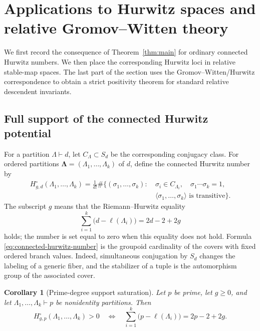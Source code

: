 \documentclass[11pt]{amsart}
\theoremstyle{plain}
\newtheorem{corollary}[theorem]{Corollary}
\theoremstyle{definition}
\numberwithin{equation}{section}
\begin{document}
\section{Applications to Hurwitz spaces and relative Gromov--Witten theory}
\label{sec:applications}

We first record the consequence of Theorem~\ref{thm:main} for ordinary
connected Hurwitz numbers.  We then place the corresponding Hurwitz loci in
relative stable-map spaces.  The last part of the section uses the
Gromov--Witten/Hurwitz correspondence to obtain a strict positivity theorem
for standard relative descendent invariants.

\subsection{Full support of the connected Hurwitz potential}

For a partition $\Lambda\vdash d$, let $C_\Lambda\subset S_d$ be the
corresponding conjugacy class.  For ordered partitions
$\boldsymbol\Lambda=(\Lambda_1,\ldots,\Lambda_k)$ of $d$, define the
connected Hurwitz number by
\begin{equation}\label{eq:connected-hurwitz-number}
 \begin{split}
 H^\circ_{g,d}(\Lambda_1,\ldots,\Lambda_k)
 =\frac{1}{d!}\#\biggl\{(\sigma_1,\ldots,\sigma_k):\ &
 \sigma_i\in C_{\Lambda_i},\quad \sigma_1\cdots\sigma_k=1,\\[-2pt]
 &\langle\sigma_1,\ldots,\sigma_k\rangle
 \text{ is transitive}\biggr\}.
 \end{split}
\end{equation}
The subscript $g$ means that the Riemann--Hurwitz equality
\begin{equation}\label{eq:application-RH}
 \sum_{i=1}^k\bigl(d-\ell(\Lambda_i)\bigr)=2d-2+2g
\end{equation}
holds; the number is set equal to zero when this equality does not hold.
Formula \eqref{eq:connected-hurwitz-number} is the groupoid cardinality of
the covers with fixed ordered branch values.  Indeed, simultaneous
conjugation by $S_d$ changes the labeling of a generic fiber, and the
stabilizer of a tuple is the automorphism group of the associated cover.

\begin{corollary}[Prime-degree support saturation]
\label{cor:hurwitz-support}
Let $p$ be prime, let $g\geq0$, and let
$\Lambda_1,\ldots,\Lambda_k\vdash p$ be nonidentity partitions.  Then
\begin{equation}\label{eq:hurwitz-support-iff}
 H^\circ_{g,p}(\Lambda_1,\ldots,\Lambda_k)>0
 \quad\Longleftrightarrow\quad
 \sum_{i=1}^k\bigl(p-\ell(\Lambda_i)\bigr)=2p-2+2g.
\end{equation}
\end{corollary}
\end{document}
